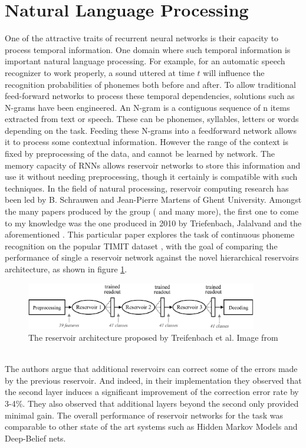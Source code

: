 \documentclass[12pt,oneside]{CUNY_CS_PhD}
\begin{document}
\section{Natural Language Processing}
One of the attractive traits of recurrent neural networks is their capacity to process temporal information. One domain where such temporal information is important natural language processing. For example, for an automatic speech recognizer to work properly, a sound uttered at time $t$ will influence the recognition probabilities of phonemes both before and after. To allow traditional feed-forward networks to process these temporal dependencies, solutions such as N-grams have been engineered. An N-gram is a contiguous sequence of n items extracted from text or speech. These can be phonemes, syllables, letters or words depending on the task. Feeding these N-grams into a feedforward network allows it to process some contextual information. However the range of the context is fixed by preprocessing of the data, and cannot be learned by network. The memory capacity of RNNs allows reservoir networks to store this information and use it without needing preprocessing, though it certainly is compatible with such techniques.
In the field of natural processing, reservoir computing research has been led by B. Schrauwen and Jean-Pierre Martens of Ghent University. Amongst the many papers produced by the group (\cite{verstraeten_isolated_2005, jalalvand_connected_2011} and many more), the first one to come to my knowledge was the one produced in 2010 by Triefenbach, Jalalvand and the aforementioned \cite{triefenbach_phoneme_2010}. This particular paper explores the task of continuous phoneme recognition on the popular TIMIT dataset \cite{timit}, with the goal of comparing the performance of single a reservoir network against the novel hierarchical reservoirs architecture, as shown in figure \ref{fig:layered-res}.
\begin{figure}[h]
\centering
\includegraphics[width=0.9\textwidth]{pictures/layered-res.png}
\caption{The reservoir architecture proposed by Treifenbach et al. Image from \cite{triefenbach_phoneme_2010}}
\label{fig:layered-res}
\end{figure}\\
The authors argue that additional reservoirs can correct some of the errors made by the previous reservoir. And indeed, in their implementation they observed that the second layer induces a significant improvement of the correction error rate by 3-4\%. They also observed that additional layers beyond the second only provided minimal gain. The overall performance of reservoir networks for the task was comparable to other state of the art systems such as Hidden Markov Models and Deep-Belief nets. 
\end{document}
